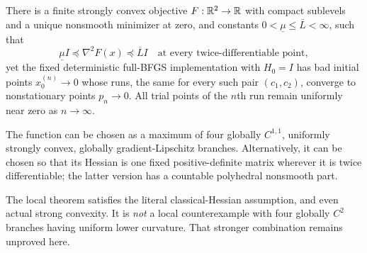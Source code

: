 \begin{theorem}\label{L:thm:local}
There is a finite strongly convex objective $F:\mathbb R^2\to\mathbb R$ with compact sublevels and a unique nonsmooth minimizer at zero, and constants $0<\underline\mu\le\overline L<\infty$, such that
\[
 \underline\mu I\preceq \nabla^2F(x)\preceq\overline L I
 \quad\text{at every twice-differentiable point},
\]
yet the fixed deterministic full-BFGS implementation with $H_0=I$ has bad initial points $x_0^{(n)}\to0$ whose runs, the same for every such pair $(c_1,c_2)$, converge to nonstationary points $p_n\to0$. All trial points of the $n$th run remain uniformly near zero as $n\to\infty$.

The function can be chosen as a maximum of four globally $C^{1,1}$, uniformly strongly convex, globally gradient-Lipschitz branches. Alternatively, it can be chosen so that its Hessian is one fixed positive-definite matrix wherever it is twice differentiable; the latter version has a countable polyhedral nonsmooth part.
\end{theorem}
\noindent The local theorem satisfies the literal classical-Hessian assumption, and even actual strong convexity. It is \emph{not} a local counterexample with four globally $C^2$ branches having uniform lower curvature. That stronger combination remains unproved here.


\setcounter{section}{1}
\setcounter{theorem}{2}
\setcounter{lemma}{0}
\setcounter{corollary}{0}
\setcounter{proposition}{0}
\setcounter{remark}{0}
\setcounter{equation}{0}


